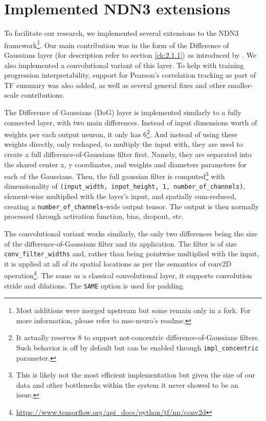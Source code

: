 \section{Implemented NDN3 extensions}

To facilitate our research, we implemented several extensions to the NDN3 framework\footnote{Most additions were merged upstream but some remain only in a fork. For more information, please refer to msc-neuro's readme.}. Our main contribution was in the form of the Difference of Gaussians layer (for description refer to section \ref{ch:2.1.1}) as introduced by \cite{antolik}. We also implemented a convolutional variant of this layer. To help with training progression interpretability, support for Pearson’s correlation tracking as part of TF summary was also added, as well as several general fixes and other smaller-scale contributions.

The Difference of Gaussians (DoG) layer is implemented similarly to a fully connected layer, with two main differences. Instead of input dimensions worth of weights per each output neuron, it only has 6\footnote{It actually reserves 8 to support not-concentric difference-of-Gaussians filters. Such behavior is off by default but can be enabled through \texttt{impl\_concentric} parameter.}. And instead of using these weights directly, only reshaped, to multiply the input with, they are used to create a full difference-of-Gaussians filter first. Namely, they are separated into the shared center x, y coordinates, and weights and diameters parameters for each of the Gaussians. Then, the full gaussian filter is computed\footnote{This is likely not the most efficient implementation but given the size of our data and other bottlenecks within the system it never showed to be an issue.} with dimensionality of \texttt{(input\_width, input\_height, 1, number\_of\_channels)}, element-wise multiplied with the layer’s input, and spatially sum-reduced, creating a \texttt{number\_of\_channels}-wide output tensor. The output is then normally processed through activation function, bias, dropout, etc.

The convolutional variant works similarly, the only two differences being the size of the difference-of-Gaussians filter and its application. The filter is of size \texttt{conv\_filter\_widths} and, rather than being pointwise multiplied with the input, it is applied at all of its spatial locations as per the semantics of conv2D operation\footnote{\href{https://www.tensorflow.org/api_docs/python/tf/nn/conv2d}{https://www.tensorflow.org/api\_docs/python/tf/nn/conv2d}}. The same as a classical convolutional layer, it supports convolution stride and dilations. The \texttt{SAME} option is used for padding. 

